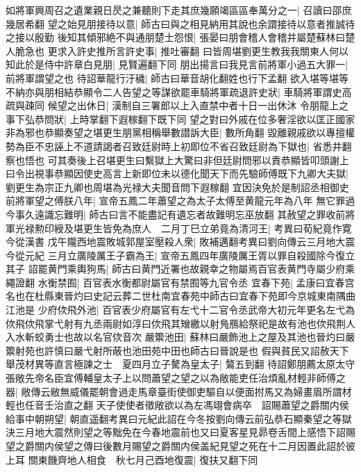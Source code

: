 如將軍興周召之遺業親日昃之兼聽則下走其庶幾願竭區區奉萬分之一|{
	召讀曰邵庶幾居希翻}
望之始見朋接待以意|{
	師古曰與之相見納用其說也余謂接待以意者推誠待之接以殷勤}
後知其傾邪絶不與通朋楚士怨恨|{
	張晏曰朋會稽人會稽并屬楚蘇林曰楚人脆急也}
更求入許史推所言許史事|{
	推吐審翻}
曰皆周堪劉更生教我我關東人何以知此於是侍中許章白見朋|{
	見賢遍翻下同}
朋出揚言曰我見言前將軍小過五大罪一|{
	前將軍謂望之也}
待詔華龍行汙穢|{
	師古曰華音胡化翻姓也行下孟翻}
欲入堪等堪等不納亦與朋相結恭顯令二人告望之等謀欲罷車騎將軍疏退許史狀|{
	車騎將軍謂史高疏與疎同}
候望之出休日|{
	漢制自三署郎以上入直禁中者十日一出休沐}
令朋龍上之事下弘恭問狀|{
	上時掌翻下遐稼翻下既下同}
望之對曰外戚在位多奢淫欲以匡正國家非為邪也恭顯奏望之堪更生朋黨相稱舉數譛訴大臣|{
	數所角翻}
毀離親戚欲以專擅權勢為臣不忠誣上不道請謁者召致廷尉時上初即位不省召致廷尉為下獄也|{
	省悉井翻察也悟也}
可其奏後上召堪更生曰繫獄上大驚曰非但廷尉問邪以責恭顯皆叩頭謝上曰令出視事恭顯因使史高言上新即位未以德化聞天下而先驗師傅既下九卿大夫獄|{
	劉更生為宗正九卿也周堪為光禄大夫聞音問下遐稼翻}
宜因決免於是制詔丞相御史前將軍望之傅朕八年|{
	宣帝五鳳二年蕭望之為太子太傅至黄龍元年為八年}
無它罪過今事久遠識忘難明|{
	師古曰言不能盡記有遺忘者故難明忘巫放翻}
其赦望之罪收前將軍光禄勲印綬及堪更生皆免為庶人　二月丁巳立弟竟為清河王|{
	考異曰荀紀竟作寛今從漢書}
戊午隴西地震敗城郭屋室壓殺人衆|{
	敗補邁翻考異曰劉向傳云三月地大震今從元紀}
三月立廣陵厲王子霸為王|{
	宣帝五鳳四年廣陵厲王胥以罪自殺國除今復立其子}
詔罷黄門乘輿狗馬|{
	師古曰黄門近署也故親幸之物屬焉百官表黄門寺屬少府乘繩證翻}
水衡禁囿|{
	百官表水衡都尉屬官有禁囿等九官令丞}
宜春下苑|{
	孟康曰宜春宫名也在杜縣東晉灼曰史記云葬二世杜南宜春苑中師古曰宜春下苑即今京城東南隅曲江池是}
少府佽飛外池|{
	百官表少府屬官有左弋十二官令丞武帝大初元年更名左弋為佽飛佽飛掌弋射有九丞兩尉如淳曰佽飛其矰繳以射鳬鴈給祭祀是故有池也佽飛荆人入水斬蛟勇士也故以名官佽音次}
嚴籞池田|{
	蘇林曰嚴飾池上之屋及其池也晉灼曰嚴籞射苑也許慎曰嚴弋射所蔽也池田苑中田也師古曰晉說是也}
假與貧民又詔赦天下舉茂材異等直言極諫之士　夏四月立子驁為皇太子|{
	鷔五到翻}
待詔鄭朋薦太原太守張敞先帝名臣宜傅輔皇太子上以問蕭望之望之以為敞能吏任治煩亂材輕非師傅之器|{
	敞傳云敝無威儀罷朝會過走馬章臺街使御吏驅自以便面拊馬又為婦畫眉所謂材輕也任音壬治直之翻}
天子使使者徵敞欲以為左馮翊會病卒　詔賜蕭望之爵關内侯給事中朝朔望|{
	朝直遥翻考異曰元紀此詔在今冬按劉向傳云前弘恭石顯秦望之等獄決三月地大震然則望之等黜免在今春地震前也又曰夏客星見昴卷舌間上感悟下詔賜望之爵關内侯望之傳曰後數月賜望之爵關内侯盖紀見望之死在十二月因置此詔於彼上耳}
關東饑齊地人相食　秋七月己酉地復震|{
	復扶又翻下同}


